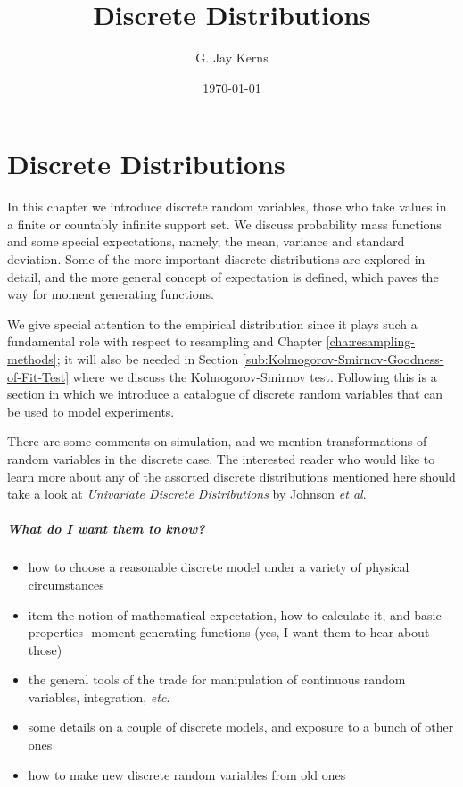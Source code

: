\documentclass[captions=tableheading]{scrbook}
\title{Discrete Distributions}
\author{G. Jay Kerns}
\date{\today}
\begin{document}
\maketitle


\chapter{Discrete Distributions}
\label{sec-1}

\label{cha:Discrete-Distributions}


\noindent In this chapter we introduce discrete random variables, those who take values in a finite or countably infinite support set. We discuss probability mass functions and some special expectations, namely, the mean, variance and standard deviation. Some of the more important discrete distributions are explored in detail, and the more general concept of expectation is defined, which paves the way for moment generating functions. 

We give special attention to the empirical distribution since it plays such a fundamental role with respect to resampling and Chapter \ref{cha:resampling-methods}; it will also be needed in Section \ref{sub:Kolmogorov-Smirnov-Goodness-of-Fit-Test} where we discuss the Kolmogorov-Smirnov test. Following this is a section in which we introduce a catalogue of discrete random variables that can be used to model experiments.

There are some comments on simulation, and we mention transformations of random variables in the discrete case. The interested reader who would like to learn more about any of the assorted discrete distributions mentioned here should take a look at \emph{Univariate Discrete Distributions} by Johnson \emph{et al}\cite{Johnson1993}.


\paragraph*{What do I want them to know?}

\begin{itemize}
\item how to choose a reasonable discrete model under a variety of physical circumstances
\item item the notion of mathematical expectation, how to calculate it, and basic properties- moment generating functions (yes, I want them to hear about those)
\item the general tools of the trade for manipulation of continuous random variables, integration, \emph{etc}.
\item some details on a couple of discrete models, and exposure to a bunch of other ones
\item how to make new discrete random variables from old ones
\end{itemize}
\end{document}
